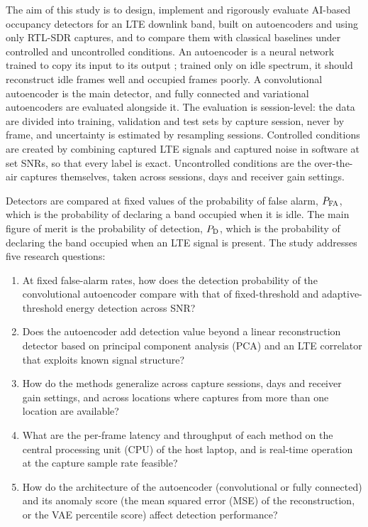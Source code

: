 The aim of this study is to design, implement and rigorously evaluate AI-based occupancy detectors for an LTE downlink band, built on autoencoders and using only RTL-SDR captures, and to compare them with classical baselines under controlled and uncontrolled conditions. An autoencoder is a neural network trained to copy its input to its output \parencite[p.~499]{goodfellow2016}; trained only on idle spectrum, it should reconstruct idle frames well and occupied frames poorly. A convolutional autoencoder is the main detector, and fully connected and variational autoencoders are evaluated alongside it. The evaluation is session-level: the data are divided into training, validation and test sets by capture session, never by frame, and uncertainty is estimated by resampling sessions. Controlled conditions are created by combining captured LTE signals and captured noise in software at set SNRs, so that every label is exact. Uncontrolled conditions are the over-the-air captures themselves, taken across sessions, days and receiver gain settings.

Detectors are compared at fixed values of the probability of false alarm, $P_{\mathrm{FA}}$, which is the probability of declaring a band occupied when it is idle. The main figure of merit is the probability of detection, $P_{\mathrm{D}}$, which is the probability of declaring the band occupied when an LTE signal is present. The study addresses five research questions:

\begin{enumerate}[label=\textbf{RQ\arabic*.}, ref=RQ\arabic*, leftmargin=*]
  \item\label{rq:energy} At fixed false-alarm rates, how does the detection probability of the convolutional autoencoder compare with that of fixed-threshold and adaptive-threshold energy detection across SNR?
  \item\label{rq:baselines} Does the autoencoder add detection value beyond a linear reconstruction detector based on principal component analysis (PCA) and an LTE \syncsignal{} correlator that exploits known signal structure?
  \item\label{rq:generalization} How do the methods generalize across capture sessions, days and receiver gain settings, and across locations where captures from more than one location are available?
  \item\label{rq:compute} What are the per-frame latency and throughput of each method on the central processing unit (CPU) of the host laptop, and is real-time operation at the capture sample rate feasible?
  \item\label{rq:design} How do the architecture of the autoencoder (convolutional or fully connected) and its anomaly score (the mean squared error (MSE) of the reconstruction, or the VAE percentile score) affect detection performance?
\end{enumerate}

